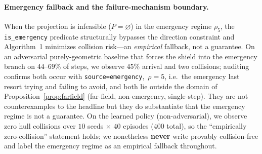 \paragraph{Emergency fallback and the failure-mechanism boundary.}
When the projection is infeasible ($P=\varnothing$) in the emergency regime
$\rho_5$, the \texttt{is\_emergency} predicate structurally bypasses the direction
constraint and Algorithm~1 minimizes collision risk---an \emph{empirical} fallback,
not a guarantee. On an adversarial purely-geometric baseline that forces the shield
into the emergency branch on $44$--$69\%$ of steps, we observe $45\%$ arrival and
two collisions; auditing confirms both occur with
\texttt{source=emergency},~$\rho=5$, i.e.\ the emergency last resort trying and
failing to avoid, and both lie outside the domain of Proposition~\ref{prop:farfield}
(far-field, non-emergency, single-step). They are not counterexamples to the headline
but they do substantiate that the emergency regime is not a guarantee. On the learned
policy (non-adversarial), we observe zero hull collisions over $10$ seeds
$\times$ $40$ episodes ($400$ total), so the ``empirically zero-collision'' statement holds; we
nonetheless \textbf{never} write provably collision-free and label the emergency
regime as an empirical fallback throughout.
